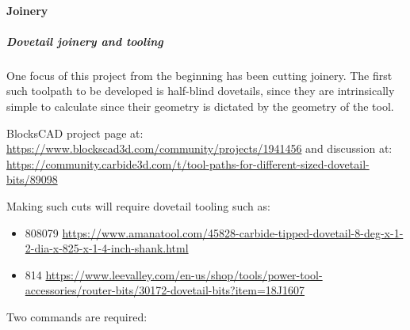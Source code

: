 \documentclass{ltxdoc}
\begin{document}
\paragraph{Joinery}

\subparagraph{Dovetail joinery and tooling}
 
\label{subsec:dovetails}

One focus of this project from the beginning has been cutting joinery. The first such toolpath to be developed is half-blind dovetails, since they are intrinsically simple to calculate since their geometry is dictated by the geometry of the tool.

BlocksCAD project page at: \url{https://www.blockscad3d.com/community/projects/1941456} and discussion at: \url{https://community.carbide3d.com/t/tool-paths-for-different-sized-dovetail-bits/89098}

Making such cuts will require dovetail tooling such as:

\begin{itemize}
\item 808079  \url{https://www.amanatool.com/45828-carbide-tipped-dovetail-8-deg-x-1-2-dia-x-825-x-1-4-inch-shank.html}
\item 814  \url{https://www.leevalley.com/en-us/shop/tools/power-tool-accessories/router-bits/30172-dovetail-bits?item=18J1607}
\end{itemize}

Two commands are required:
\end{document}
